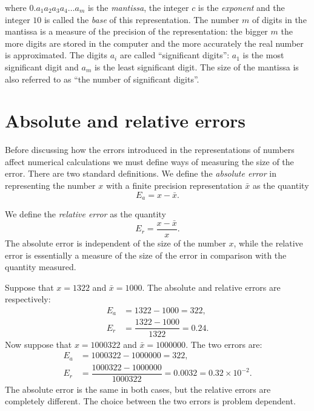%
where $0.a_1 a_2 a_3 a_4 \ldots a_m$ is the \textit{mantissa}, the
integer $c$ is the \textit{exponent} and the integer $10$ is
called the \textit{base} of this representation.  The number $m$ of
digits in the mantissa is a measure of the precision of the
representation: the bigger $m$ the more digits are stored in the
computer and the more accurately the real number is approximated.  The
digits $a_i$ are called ``significant digits'': $a_1$ is the most
significant digit and $a_m$ is the least significant digit.  The size
of the mantissa is also referred to as ``the number of significant
digits''.

\section{Absolute and relative errors}

Before discussing how the errors introduced in the representations of
numbers affect numerical calculations we must define ways of measuring
the size of the error.  There are two standard definitions.    We define
the \textit{absolute error} in representing the number $x$ with a
finite precision representation $\bar{x}$ as the quantity
%
\begin{equation*}
  E_a = x - \bar x.
\end{equation*}

%
We define the \textit{relative error} as the quantity
%
\begin{equation*}
  E_r = \frac{x - \bar x}{x} .
\end{equation*}
%
The absolute error is independent of the size of the number $x$, while
the relative error is essentially a measure of the size of the error
in comparison with the quantity measured.

\medskip


\smallskip

Suppose that $x=1322$ and $\bar x = 1000$.  The absolute and relative
errors are respectively:
%
\begin{align*}
  E_a &= 1322 - 1000 = 322, \\
  E_r &= \dfrac{1322 - 1000}{1322} = 0.24 .
\end{align*}
%
Now suppose that $x=1000322$ and $\bar x = 1000000$.   The two errors
are:
%
\begin{align*}
  E_a &= 1000322 - 1000000 = 322, \\
  E_r &= \dfrac{1000322 - 1000000}{1000322} = 0.0032 = 0.32
  \times 10^{-2} .
\end{align*}
%
The absolute error is the same in both cases, but the relative errors
are completely different.    The choice between the two errors is
problem dependent.

